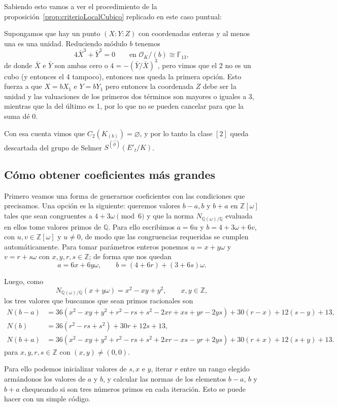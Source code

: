 \documentclass[a4paper]{book}
\theoremstyle{definition}
\theoremstyle{plain}
\newcommand{\QQ}{\mathbb{Q}}
\newcommand{\ZZ}{\mathbb{Z}}
\newcommand{\FF}{\mathbb{F}}
\newcommand{\OO}{\mathcal{O}}
\begin{document}
Sabiendo esto vamos a ver el procedimiento de la proposición~\ref{prop:criterioLocalCubico} replicado en este caso puntual:

Supongamos que hay un punto $(X:Y:Z)$ con coordenadas enteras y al menos una es una unidad. Reduciendo módulo $b$ tenemos 
\[
4\bar{X}^3+\bar{Y}^3=0 \qquad\text{en }\OO_K/(b)\cong\FF_{13},
\]
de donde $\bar{X}$ e $\bar{Y}$ son ambas cero o $4={-(\bar{Y}/\bar{X})}^3$, pero vimos que el 2 no es un cubo (y entonces el 4 tampoco), entonces nos queda la primera opción. Esto fuerza a que $X=bX_1$ e $Y=bY_1$ pero entonces la coordenada $Z$ debe ser la unidad y las valuaciones de los primeros dos términos son mayores o iguales a 3, mientras que la del último es 1, por lo que no se pueden cancelar para que la suma dé 0. 

Con esa cuenta vimos que $C_2(K_{(b)})=\varnothing$, y por lo tanto la clase $[2]$ queda descartada del grupo de Selmer $S^{(\hat\phi)}(E'_t/K)$.

\subsection*{Cómo obtener coeficientes más grandes}

Primero veamos una forma de generarnos coeficientes con las condiciones que precisamos. Una opción es la siguiente: queremos valores $b-a, b$ y $b+a$ en $\ZZ[\omega]$ tales que sean congruentes a $4+3\omega \pmod{6}$ y que la norma $N_{\QQ(\omega)/\QQ}$ evaluada en ellos tome valores primos de $\QQ$. Para ello escribimos $a=6u$ y $b=4+3\omega+6v$, con $u,v\in\ZZ[\omega]$ y $u\neq0$, de modo que las congruencias requeridas se cumplen automáticamente. Para tomar parámetros enteros ponemos $u=x+y\omega$ y $v=r+s\omega$ con $x,y,r,s\in\ZZ$; de forma que nos quedan
\[
a=6x+6y\omega, \qquad b=(4+6r)+(3+6s)\omega.
\]

Luego, como
\[
N_{\QQ(\omega)/\QQ}(x+y\omega)=x^2-xy+y^2,\qquad x,y\in\ZZ,
\]
los tres valores que buscamos que sean primos racionales son
\[
\begin{aligned}
N(b-a)
&=36(x^2-xy+y^2+r^2-rs+s^2-2xr+xs+yr-2ys)
  +30(r-x)+12(s-y)+13,\\
N(b)
&=36(r^2-rs+s^2)+30r+12s+13,\\
N(b+a)
&=36(x^2-xy+y^2+r^2-rs+s^2+2xr-xs-yr+2ys)
  +30(r+x)+12(s+y)+13.
\end{aligned}
\]
para $x,y,r,s\in\ZZ$ con $(x,y)\neq (0,0)$.

Para ello podemos inicializar valores de $s,x$ e $y$, iterar $r$ entre un rango elegido armándonos los valores de $a$ y $b$, y calcular las normas de los elementos $b-a$, $b$ y $b+a$ chequeando si son tres números primos en cada iteración. Esto se puede hacer con un simple código.
\end{document}
